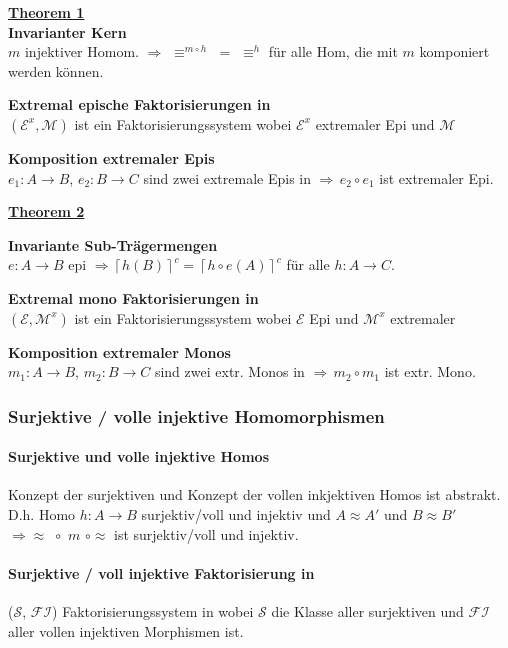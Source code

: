 \begin{multicols}{2}

\textbf{\underline{Theorem 1}} \\

\textbf{ Invarianter Kern} \\
$m$ injektiver Homom. $\Rightarrow \, \, \equiv^{m \circ h} \, \, = \, \, \equiv^h$ für alle Hom, die mit $m$ komponiert werden können.

\textbf{ Extremal epische Faktorisierungen in \syssig} \\
$(\mathcal{E}^{x}, \mathcal{M})$ ist ein Faktorisierungssystem wobei $\mathcal{E}^{x}$ extremaler Epi und $\mathcal{M}$ \mono

\textbf{ Komposition extremaler Epis} \\
$e_1 : A \rightarrow B$, $e_2 : B \rightarrow C$ sind zwei extremale Epis in \syssig $\Rightarrow \, e_2 \circ e_1$ ist extremaler Epi.

\columnbreak
\textbf{\underline{Theorem 2}}

\textbf{ Invariante Sub-Trägermengen} \\
$e: A \rightarrow B$ epi $\Rightarrow \left\lceil h(B) \right\rceil ^{c} = \left\lceil h\circ e(A)\right\rceil ^{c}$ für alle \homos $h: A \rightarrow C$.

\textbf{ Extremal mono Faktorisierungen in \syssig} \\
$(\mathcal{E}, \mathcal{M}^{x})$ ist ein Faktorisierungssystem wobei $\mathcal{E}$ Epi und $\mathcal{M}^{x}$ extremaler \mono

\textbf{ Komposition extremaler Monos} \\
$m_1 : A \rightarrow B$, $m_2 : B \rightarrow C$ sind zwei extr. Monos in \syssig $\Rightarrow \, m_2 \circ m_1$ ist extr. Mono.
\end{multicols}

\subsubsection{Surjektive / volle injektive Homomorphismen}

\paragraph{ Surjektive und volle injektive Homos}
Konzept der surjektiven und Konzept der vollen inkjektiven Homos ist abstrakt. D.h. Homo $h:A \rightarrow B$ surjektiv/voll und injektiv und $A \approx A'$ und $B \approx B'$ $\Rightarrow \approx \, \, \circ \, \, m \, \, \circ \approx$ ist surjektiv/voll und injektiv.

\paragraph{ Surjektive / voll injektive Faktorisierung in \syssig}
($\mathcal{S}$, $\mathcal{FI}$) Faktorisierungssystem in \syssig wobei $\mathcal{S}$ die Klasse aller surjektiven und $\mathcal{FI}$ aller vollen injektiven Morphismen ist.


